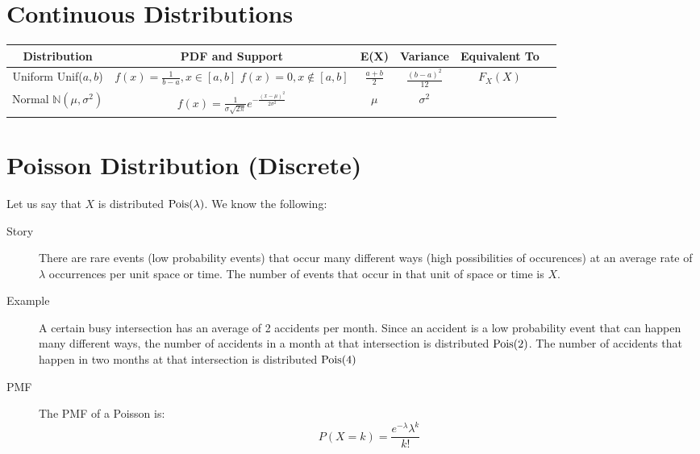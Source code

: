 \documentclass[11pt]{article}
\theoremstyle{definition}
\theoremstyle{remark}
\newcommand{\N}{\mathbb{N}}
\newcommand{\Unif}{\textnormal{Unif}}
\newcommand{\Pois}{\textnormal{Pois}}
\begin{document}
\section{Continuous Distributions}
\begin{center}
\renewcommand{\arraystretch}{2}
\begin{tabular}{cccccc}
\textbf{Distribution} & \textbf{PDF and Support} & \textbf{E(X)}  & \textbf{Variance}  &\textbf{Equivalent To}\\
\hline

\shortstack{Uniform \\ \Unif($a, b$)} & \shortstack{$ f(x) = \frac{1}{b-a}, x \in [a, b] $ \\$ f(x) = 0, x \notin [a, b]$} & $\frac{a+b}{2}$ & $\frac{(b-a)^2}{12}$ & $F_X(X)$ \\
\hline
\shortstack{Normal \\ $\N(\mu, \sigma^2)$} & $f(x) = \frac{1}{\sigma \sqrt{2\pi}} e^{-\frac{(x - \mu)^2}{2 \sigma^2}}$ & $\mu$  & $\sigma^2$ & \\
\hline

\end{tabular}
\end{center}

\section{Poisson Distribution (Discrete)}
\begin{description}
\item Let us say that $X$ is distributed $\Pois(\lambda)$. We know the following:
\begin{description}
	\item[Story] There are rare events (low probability events) that occur many different ways (high possibilities of occurences) at an average rate of $\lambda$ occurrences per unit space or time. The number of events that occur in that unit of space or time is $X$.
	
	\item[Example] A certain busy intersection has an average of 2 accidents per month. Since an accident is a low probability event that can happen many different ways, the number of accidents in a month at that intersection is distributed $\Pois(2)$. The number of accidents that happen in two months at that intersection is distributed $\Pois(4)$
	
	\item[PMF] The PMF of a Poisson is:
\[P(X = k) = \frac{e^{-\lambda}\lambda^k}{k!}\]
\end{description}
\end{description}
\end{document}
